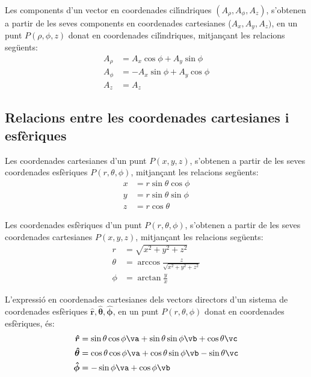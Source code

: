 \documentclass[catalan,a4paper,twoside,11pt]{article}
\begin{document}
Les components d'un vector en coordenades cil\'{\i}ndriques $(A_\rho, A_\phi, A_z)$, s'obtenen a partir de les seves components en coordenades cartesianes ($A_x, A_y, A_z)$, en un punt $P(\rho,\phi,z)$ donat en coordenades cil\'{\i}ndriques, mitjan\c{c}ant les relacions seg\"{u}ents:
\begin{subequations}\begin{align}
    A_\rho &=  A_x\cos\phi+A_y\sin\phi\\
    A_\phi &= -A_x\sin\phi+A_y\cos\phi \\
    A_z &= A_z
\end{align}\end{subequations}


\subsection{Relacions entre les coordenades cartesianes i
esf\`{e}riques}

Les coordenades cartesianes  d'un punt $P(x,y,z)$, s'obtenen a partir
de les seves coordenades esf\`{e}riques $P(r,\theta,\phi)$,
mitjan\c{c}ant les relacions seg\"{u}ents:
\begin{subequations}\begin{align}
    x &=r\sin\theta\cos\phi \\ y &=r\sin\theta\sin\phi \\ z &=r\cos\theta
\end{align}\end{subequations}

Les coordenades  esf\`{e}riques  d'un punt $P(r,\theta,\phi)$,
s'obtenen a partir de les seves coordenades cartesianes $P(x,y,z)$,
mitjan\c{c}ant les relacions seg\"{u}ents:
\begin{subequations}\begin{align}
    r &=\sqrt{x^2+y^2+z^2}\\
    \theta&=\arccos\frac{z}{\sqrt{x^2+y^2+z^2}}\\
    \phi &=\arctan\frac{y}{x}
\end{align}\end{subequations}


L'expressi\'{o} en coordenades cartesianes dels vectors directors d'un sistema de coordenades  esf\`{e}riques $\boldsymbol{\hat{r}},\boldsymbol{\hat{\theta}},\boldsymbol{\hat{\phi}}$, en un punt $P(r,\theta,\phi)$ donat en coordenades esf\`{e}riques, \'{e}s:
\begin{subequations}\begin{align}
    \boldsymbol{\hat{r}} &=\sin\theta\cos\phi\va+ \sin\theta\sin\phi\vb+\cos\theta\vc\\
    \boldsymbol{\hat{\theta}} &=\cos\theta\cos\phi\va+
    \cos\theta\sin\phi\vb-\sin\theta\vc\\
    \boldsymbol{\hat{\phi}}&=-\sin\phi\va+\cos\phi\vb
\end{align}\end{subequations}
\end{document}
